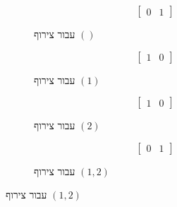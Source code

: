 \documentclass[12pt,leqno]{article}
\theoremstyle{theoremdd}
\begin{document}
\begin{figure}[ht]
    \caption{מצבי הלוחות לאחר לחיצה של צירוף}
    \label{fig:no-sol-example-2x1}
    \centering
    \begin{subfigure}{.20\textwidth}
        \caption{
            עבור צירוף
            $()$
        }
        \[
            \begin{bmatrix}
                0 & 1
            \end{bmatrix}
        \]
    \end{subfigure}
    \begin{subfigure}{.20\textwidth}
        \caption{
            עבור צירוף
            $(1)$
        }
        \[
            \begin{bmatrix}
                1 & 0
            \end{bmatrix}
        \]
    \end{subfigure}
    \begin{subfigure}{.20\textwidth}
        \caption{
            עבור צירוף
            $(2)$
        }
        \[
            \begin{bmatrix}
                1 & 0
            \end{bmatrix}
        \]
    \end{subfigure}
    \begin{subfigure}{.20\textwidth}
        \caption{
            עבור צירוף
            $(1, 2)$
        }
        \[
            \begin{bmatrix}
                0 & 1
            \end{bmatrix}
        \]
    \end{subfigure}%
\end{figure}
\end{document}

